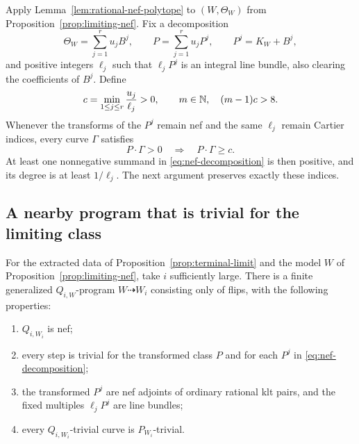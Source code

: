 Apply Lemma~\ref{lem:rational-nef-polytope} to $(W,\Theta_W)$ from
Proposition~\ref{prop:limiting-nef}.  Fix a decomposition
\begin{equation}
 \Theta_W=\sum_{j=1}^r u_jB^j,\qquad
 P=\sum_{j=1}^r u_jP^j,\qquad P^j=K_W+B^j,
 \label{eq:nef-decomposition}
\end{equation}
and positive integers $\ell_j$ such that $\ell_jP^j$ is an integral
line bundle, also clearing the coefficients of $B^j$.
Define
\begin{equation}
 c=\min_{1\le j\le r}\frac{u_j}{\ell_j}>0,
 \qquad
 m\in\mathbb N,\quad (m-1)c>8.
 \label{eq:gap-and-amplification}
\end{equation}
Whenever the transforms of the $P^j$ remain nef and the same $\ell_j$
remain Cartier indices, every curve $\Gamma$ satisfies
\begin{equation}
 P\cdot\Gamma>0\quad\Longrightarrow\quad P\cdot\Gamma\ge c.
 \label{eq:positive-gap}
\end{equation}
At least one nonnegative summand in \eqref{eq:nef-decomposition} is then
positive, and its degree is at least $1/\ell_j$.
The next argument preserves exactly these indices.

\subsection{A nearby program that is trivial for the limiting class}

\begin{proposition}
\label{prop:trivial-perturbation}
For the extracted data of Proposition~\ref{prop:terminal-limit} and the
model $W$ of Proposition~\ref{prop:limiting-nef}, take $i$ sufficiently
large.  There is a finite generalized $Q_{i,W}$-program
$W\dashrightarrow W_i$ consisting only of flips, with the following
properties:
\begin{enumerate}
 \item $Q_{i,W_i}$ is nef;
 \item every step is trivial for the transformed class $P$ and for
       each $P^j$ in \eqref{eq:nef-decomposition};
 \item the transformed $P^j$ are nef adjoints of ordinary rational
       klt pairs, and the fixed multiples $\ell_jP^j$ are line bundles;
 \item every $Q_{i,W_i}$-trivial curve is $P_{W_i}$-trivial.
\end{enumerate}
\end{proposition}

